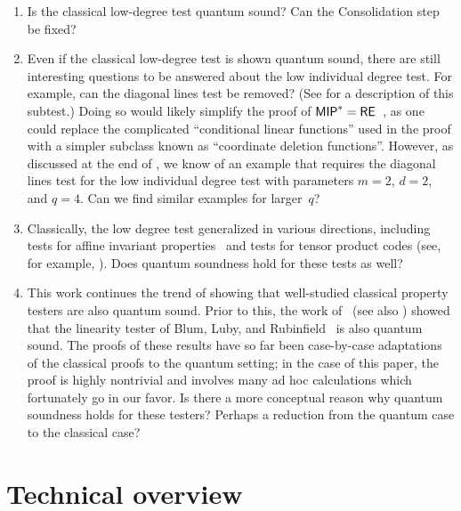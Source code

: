 \begin{enumerate}
\item Is the classical low-degree test quantum sound? Can the Consolidation step be fixed?
\item Even if the classical low-degree test is shown quantum sound,
	there are still interesting questions to be answered about the low individual degree test.
	For example, can the diagonal lines test be removed? (See  for a description of this subtest.)
	Doing so would likely simplify the proof of $\mathsf{MIP}^* = \mathsf{RE}$~\cite{JNV+20},
	as one could replace the complicated ``conditional linear functions'' used in the proof
	with a simpler subclass known as ``coordinate deletion functions''.
	However, as discussed at the end of ,
	we know of an example that requires the diagonal lines test
	for the low individual degree test with parameters $m = 2$, $d = 2$, and $q = 4$.
	Can we find similar examples for larger~$q$?
\item Classically,  the low degree test
	generalized in various directions,
	including tests for affine invariant properties~\cite{KS08,Sud11}
	and tests for tensor product codes (see, for example, \cite{CMS17}).
	Does quantum soundness hold for these tests as well?
\item This work continues the trend of showing that well-studied classical property testers
	are also quantum sound.
	Prior to this, the work of~\cite{IV12} (see also \cite[Chapter 2]{Vid11}) showed that the linearity tester of Blum, Luby, and Rubinfield~\cite{BLR93}
	is also quantum sound.
	The proofs of these results have so far been case-by-case adaptations of the classical proofs to the quantum setting;
	in the case of this paper, the proof is highly nontrivial
	and involves many ad hoc calculations which fortunately go in our favor.
	Is there a more conceptual reason why quantum soundness holds for these testers?
	Perhaps a reduction from the quantum case to the classical case?
\end{enumerate}











\section{Technical overview}\label{sec:technical-overview}


